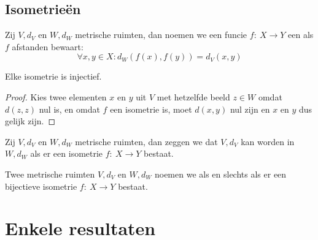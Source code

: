 \documentclass[main.tex]{subfiles}
\begin{document}
\subsection{Isometrie\"en}
\label{sec:isometrieen}

\begin{de}
  Zij $V,d_{V}$ en $W,d_{W}$ metrische ruimten, dan noemen we een funcie $f:\ X \rightarrow Y$ een  als $f$ afstanden bewaart:
  \[ \forall x,y \in X: d_{W}(f(x),f(y)) = d_{V}(x,y) \]
\end{de}

\begin{st}
  \label{st:isometrie-dan-injectie}
  Elke isometrie is injectief.

  \begin{proof}
    Kies twee elementen $x$ en $y$ uit $V$ met hetzelfde beeld $z\in W$ omdat $d(z,z)$ nul is, en omdat $f$ een isometrie is, moet $d(x,y)$ nul zijn en $x$ en $y$ dus gelijk zijn.
  \end{proof}
\end{st}

\begin{de}
  Zij $V,d_{V}$ en $W,d_{W}$ metrische ruimten, dan zeggen we dat $V,d_{V}$  kan worden in $W,d_{W}$ als er een isometrie $f:\ X \rightarrow Y$ bestaat.
\end{de}

\begin{de}
  Twee metrische ruimten $V,d_{V}$ en $W,d_{W}$ noemen we  als en slechts als er een bijectieve isometrie $f:\ X \rightarrow Y$ bestaat.
\end{de}




\section{Enkele resultaten}
\label{sec:enkele-resultaten}
\end{document}
